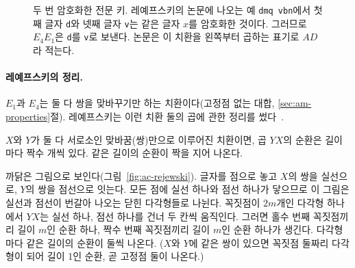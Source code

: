 \begin{figure}[ht]
\centering
{}
\caption{두 번 암호화한 전문 키. 레예프스키의 논문에 나오는 예 \texttt{dmq vbn}에서 첫째 글자 \texttt{d}와 넷째 글자
\texttt{v}는 같은 글자 $x$를 암호화한 것이다. 그러므로 $E_4E_1$은 \texttt{d}를 \texttt{v}로 보낸다. 논문은 이 치환을
왼쪽부터 곱하는 표기로 $AD$라 적는다.}
\label{fig:ac-indicator}
\end{figure}

\paragraph{레예프스키의 정리.} $E_1$과 $E_4$는 둘 다 쌍을 맞바꾸기만 하는 치환이다(고정점 없는 대합,
\ref{sec:am-properties}절). 레예프스키는 이런 치환 둘의 곱에 관한 정리를 썼다~\cite{rejewski1980application}.

\begin{keybox}[title={레예프스키의 정리}]
$X$와 $Y$가 둘 다 서로소인 맞바꿈(쌍)만으로 이루어진 치환이면, 곱 $YX$의 순환은 길이마다 짝수 개씩 있다. 같은 길이의
순환이 짝을 지어 나온다.
\end{keybox}

까닭은 그림으로 보인다(그림~\ref{fig:ac-rejewski}). 글자를 점으로 놓고 $X$의 쌍을 실선으로, $Y$의 쌍을 점선으로 잇는다.
모든 점에 실선 하나와 점선 하나가 닿으므로 이 그림은 실선과 점선이 번갈아 나오는 닫힌 다각형들로 나뉜다. 꼭짓점이
$2m$개인 다각형 하나에서 $YX$는 실선 하나, 점선 하나를 건너 두 칸씩 움직인다. 그러면 홀수 번째 꼭짓점끼리 길이 $m$인
순환 하나, 짝수 번째 꼭짓점끼리 길이 $m$인 순환 하나가 생긴다. 다각형마다 같은 길이의 순환이 둘씩 나온다. ($X$와 $Y$에
같은 쌍이 있으면 꼭짓점 둘짜리 다각형이 되어 길이 1인 순환, 곧 고정점 둘이 나온다.)

